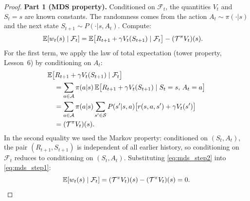 \documentclass[11pt,a4paper]{article}
\begin{document}
\begin{proof}
\textbf{Part 1 (MDS property).}
Conditioned on $\mathcal{F}_t$, the quantities $V_t$ and
$S_t = s$ are known constants.  The randomness comes from the
action $A_t \sim \pi(\cdot|s)$ and the next state
$S_{t+1} \sim P(\cdot|s, A_t)$.  Compute:
\begin{align}
  \mathbb{E}[w_t(s) \mid \mathcal{F}_t]
  &= \mathbb{E}\bigl[R_{t+1} + \gamma V_t(S_{t+1})
    \mid \mathcal{F}_t\bigr]
    - (\mathcal{T}^\pi V_t)(s).
  \label{eq:mds_step1}
\end{align}
For the first term, we apply the law of total expectation
(tower property, Lesson~6) by conditioning on $A_t$:
\begin{align}
  &\mathbb{E}\bigl[R_{t+1} + \gamma V_t(S_{t+1})
    \mid \mathcal{F}_t\bigr] \nonumber\\
  &\quad= \sum_{a \in \mathcal{A}} \pi(a|s)\,
    \mathbb{E}\bigl[R_{t+1} + \gamma V_t(S_{t+1})
    \mid S_t = s,\, A_t = a\bigr] \nonumber\\
  &\quad= \sum_{a \in \mathcal{A}} \pi(a|s)
    \sum_{s' \in \mathcal{S}} P(s'|s,a)
    \bigl[r(s,a,s') + \gamma V_t(s')\bigr] \nonumber\\
  &\quad= (\mathcal{T}^\pi V_t)(s).
  \label{eq:mds_step2}
\end{align}
In the second equality we used the Markov property:
conditioned on $(S_t, A_t)$, the pair $(R_{t+1}, S_{t+1})$ is
independent of all earlier history, so conditioning on
$\mathcal{F}_t$ reduces to conditioning on $(S_t, A_t)$.
Substituting \eqref{eq:mds_step2} into \eqref{eq:mds_step1}:
\[
  \mathbb{E}[w_t(s) \mid \mathcal{F}_t]
  = (\mathcal{T}^\pi V_t)(s)
    - (\mathcal{T}^\pi V_t)(s)
  = 0.
\]


\end{proof}
\end{document}
